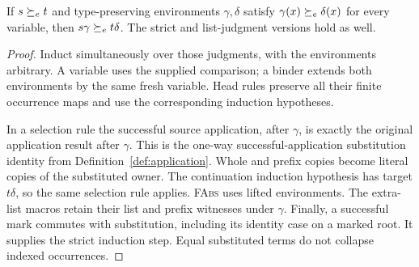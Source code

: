 \begin{lemma}\label{lem:two-environments}
If $s\succeq_e t$ and type-preserving environments $\gamma,\delta$
satisfy $\gamma(x)\succeq_e \delta(x)$ for every variable,
then $s\gamma\succeq_e t\delta$. The strict and list-judgment
versions hold as well.
\end{lemma}
\begin{proof}
Induct simultaneously over those judgments, with the
environments arbitrary. A variable uses the supplied
comparison; a binder extends both environments by
the same fresh variable. Head rules preserve all
their finite occurrence maps and use the corresponding
induction hypotheses.

In a selection rule the successful source application,
after $\gamma$, is exactly the original application
result after $\gamma$. This is the one-way
successful-application substitution identity from
Definition~\ref{def:application}. Whole and prefix
copies become literal copies of the substituted owner.
The continuation induction hypothesis has target
$t\delta$, so the same selection rule applies.
\textsc{FAbs} uses lifted environments. The extra-list
macros retain their list and prefix witnesses under
$\gamma$. Finally, a successful mark commutes with
substitution, including its identity case on a marked
root. It supplies the strict induction step. Equal
substituted terms do not collapse indexed occurrences.
\end{proof}

